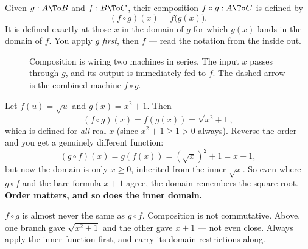 \begin{definition}[Composition]
\label{ch02:def-composition}
Given $g : A \To B$ and $f : B \To C$, their composition $f \circ g : A \To C$ is
defined by
\[
  (f \circ g)(x) = f\bigl(g(x)\bigr).
\]
It is defined exactly at those $x$ in the domain of $g$ for which $g(x)$ lands in
the domain of $f$. You apply $g$ \emph{first}, then $f$ --- read the notation from
the inside out.
\end{definition}

\begin{figure}[H]
\centering
{}
\caption{Composition is wiring two machines in series. The input $x$ passes through
$g$, and its output is immediately fed to $f$. The dashed arrow is the combined
machine $f \circ g$.}
\label{ch02:fig-composition}
\end{figure}

\begin{example}
\label{ch02:ex-composition}
Let $f(u) = \sqrt{u}$ and $g(x) = x^2 + 1$. Then
\[
  (f \circ g)(x) = f(g(x)) = \sqrt{x^2 + 1},
\]
which is defined for \emph{all} real $x$ (since $x^2+1 \ge 1 > 0$ always). Reverse
the order and you get a genuinely different function:
\[
  (g \circ f)(x) = g(f(x)) = (\sqrt{x})^2 + 1 = x + 1,
\]
but now the domain is only $x \ge 0$, inherited from the inner $\sqrt{x}$. So even
where $g\circ f$ and the bare formula $x+1$ agree, the domain remembers the square
root. \textbf{Order matters, and so does the inner domain.}
\end{example}

\begin{trapbox}
$f \circ g$ is almost never the same as $g \circ f$. Composition is not
commutative. Above, one branch gave $\sqrt{x^2+1}$ and the other gave $x+1$ ---
not even close. Always apply the inner function first, and carry its domain
restrictions along.
\end{trapbox}

